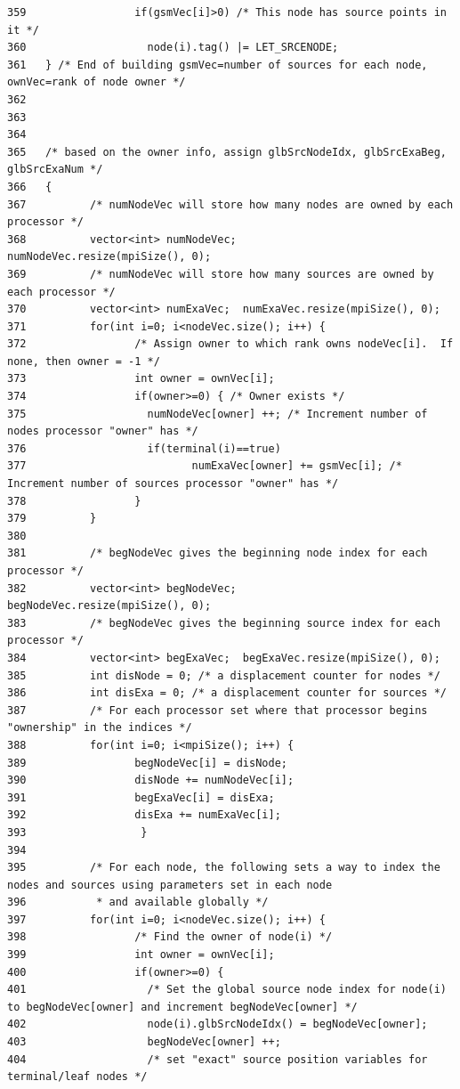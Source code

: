 \begin{verbatim}
359                 if(gsmVec[i]>0) /* This node has source points in it */
360                   node(i).tag() |= LET_SRCENODE;
361   } /* End of building gsmVec=number of sources for each node, ownVec=rank of node owner */
362 
363 
364   
365   /* based on the owner info, assign glbSrcNodeIdx, glbSrcExaBeg, glbSrcExaNum */
366   {
367          /* numNodeVec will store how many nodes are owned by each processor */
368          vector<int> numNodeVec;         numNodeVec.resize(mpiSize(), 0);
369          /* numNodeVec will store how many sources are owned by each processor */
370          vector<int> numExaVec;  numExaVec.resize(mpiSize(), 0);
371          for(int i=0; i<nodeVec.size(); i++) {
372                 /* Assign owner to which rank owns nodeVec[i].  If none, then owner = -1 */
373                 int owner = ownVec[i];
374                 if(owner>=0) { /* Owner exists */
375                   numNodeVec[owner] ++; /* Increment number of nodes processor "owner" has */
376                   if(terminal(i)==true)
377                          numExaVec[owner] += gsmVec[i]; /* Increment number of sources processor "owner" has */
378                 }
379          }       
380 
381          /* begNodeVec gives the beginning node index for each processor */
382          vector<int> begNodeVec;         begNodeVec.resize(mpiSize(), 0);
383          /* begNodeVec gives the beginning source index for each processor */
384          vector<int> begExaVec;  begExaVec.resize(mpiSize(), 0);
385          int disNode = 0; /* a displacement counter for nodes */
386          int disExa = 0; /* a displacement counter for sources */
387          /* For each processor set where that processor begins "ownership" in the indices */
388          for(int i=0; i<mpiSize(); i++) { 
389                 begNodeVec[i] = disNode;
390                 disNode += numNodeVec[i];
391                 begExaVec[i] = disExa;
392                 disExa += numExaVec[i];
393                  }
394 
395          /* For each node, the following sets a way to index the nodes and sources using parameters set in each node
396           * and available globally */
397          for(int i=0; i<nodeVec.size(); i++) {
398                 /* Find the owner of node(i) */
399                 int owner = ownVec[i];
400                 if(owner>=0) {
401                   /* Set the global source node index for node(i) to begNodeVec[owner] and increment begNodeVec[owner] */
402                   node(i).glbSrcNodeIdx() = begNodeVec[owner];
403                   begNodeVec[owner] ++;
404                   /* set "exact" source position variables for terminal/leaf nodes */

\end{verbatim}
